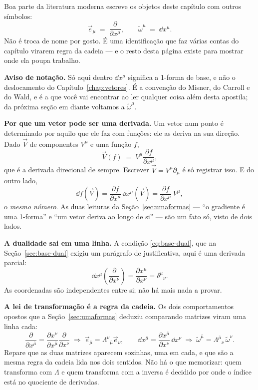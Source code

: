 \documentclass[12pt,a4paper,oneside]{book}
\theoremstyle{rgplain}
\theoremstyle{rgremark}
\begin{document}
\clearpage
{}
{}
\label{sec:leitura-derivadas}

\begin{leitura}[title={\sffamily\bfseries\footnotesize\color{rgPetroClaro}LEITURA EXTRA\hspace{0.7em}\textbullet\hspace{0.7em}VETORES SÃO DERIVADAS, 1-FORMAS SÃO DIFERENCIAIS}]

Boa parte da literatura moderna escreve os objetos deste capítulo com outros
símbolos:
\[
  \vec e_\mu \;=\; \frac{\partial}{\partial x^\mu},
  \qquad
  \tilde\omega^\mu \;=\; \dd x^\mu .
\]
Não é troca de nome por gosto. É uma identificação que faz várias contas do
capítulo virarem regra da cadeia --- e o resto desta página existe para mostrar
onde ela poupa trabalho.

\textbf{Aviso de notação.} Só aqui dentro $\dd x^\mu$ significa a 1-forma de
base, e não o deslocamento do Capítulo~\ref{chap:vetores}. É a convenção do
Misner, do Carroll e do Wald, e é a que você vai encontrar ao ler qualquer
coisa além desta apostila; da próxima seção em diante voltamos a
$\tilde\omega^\mu$.

\medskip
\textbf{Por que um vetor pode ser uma derivada.} Um vetor num ponto é
determinado por aquilo que ele faz com funções: ele as deriva na sua direção.
Dado $\vec V$ de componentes $V^\mu$ e uma função $f$,
\[
  \vec V(f)\;=\;V^\mu\frac{\partial f}{\partial x^\mu},
\]
que é a derivada direcional de sempre. Escrever $\vec V=V^\mu\partial_\mu$ é só
registrar isso. E do outro lado,
\[
  \dd f(\vec V)=\frac{\partial f}{\partial x^\mu}\,\dd x^\mu(\vec V)
              =\frac{\partial f}{\partial x^\mu}\,V^\mu ,
\]
o \emph{mesmo número}. As duas leituras da Seção~\ref{sec:umaformas} --- ``o
gradiente é uma 1-forma'' e ``um vetor deriva ao longo de si'' --- são um fato
só, visto de dois lados.

\medskip
\textbf{A dualidade sai em uma linha.} A condição \eqref{eq:base-dual}, que na
Seção~\ref{sec:base-dual} exigiu um parágrafo de justificativa, aqui é uma
derivada parcial:
\[
  \dd x^\mu\!\left(\frac{\partial}{\partial x^\nu}\right)
  =\frac{\partial x^\mu}{\partial x^\nu}
  =\delta^\mu{}_\nu .
\]
As coordenadas são independentes entre si; não há mais nada a provar.

\medskip
\textbf{A lei de transformação é a regra da cadeia.} Os dois comportamentos
opostos que a Seção~\ref{sec:umaformas} deduziu comparando matrizes viram uma
linha cada:
\[
  \frac{\partial}{\partial x^{\bar\mu}}
  =\frac{\partial x^\nu}{\partial x^{\bar\mu}}\frac{\partial}{\partial x^\nu}
  \;\Longrightarrow\;
  \vec e_{\bar\mu}=\Lambda^{\nu}{}_{\bar\mu}\vec e_\nu ,
  \qquad
  \dd x^{\bar\mu}=\frac{\partial x^{\bar\mu}}{\partial x^\nu}\,\dd x^\nu
  \;\Longrightarrow\;
  \tilde\omega^{\bar\mu}=\Lambda^{\bar\mu}{}_{\nu}\,\tilde\omega^\nu .
\]
Repare que as duas matrizes aparecem sozinhas, uma em cada, e que são a mesma
regra da cadeia lida nos dois sentidos. Não há o que memorizar: quem transforma
com $\Lambda$ e quem transforma com a inversa é decidido por onde o índice está
no quociente de derivadas.


\end{leitura}
\end{document}
